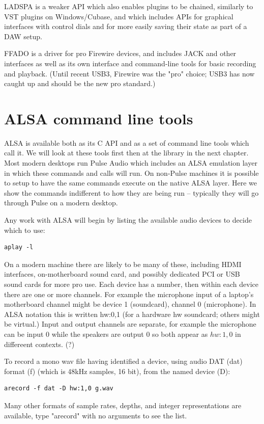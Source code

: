 \documentclass[oneside,english]{scrbook}
\begin{document}
LADSPA is a weaker API which also enables plugins to be chained, similarly to VST plugins on Windows/Cubase, and which includes APIs for graphical interfaces with control dials and for more easily saving their state as part of a DAW setup.

FFADO is a driver for pro Firewire devices, and includes JACK and other interfaces as well as its own interface and command-line tools for basic recording and playback.  (Until recent USB3, Firewire was the "pro" choice; USB3 has now caught up and should be the new pro standard.)

\chapter{ALSA command line tools}

ALSA is available both as its C API and as a set of command line tools which call it.  We will look at these tools first then at the library in the next chapter.   Most modern desktops run Pulse Audio which includes an ALSA emulation layer in which these commands and calls will run. On non-Pulse machines it is possible to setup to have the same commands execute on the native ALSA layer.  Here we show the commands indifferent to how they are being run -- typically they will go through Pulse on a modern desktop.

Any work with ALSA will begin by listing the available audio devices to decide which to use:
\begin{lstlisting}
aplay -l
\end{lstlisting}

On a modern machine there are likely to be many of these, including HDMI interfaces, on-motherboard sound card, and possibly dedicated PCI or USB sound cards for more pro use.   Each device has a number, then within each device there are one or more channels.   For example the microphone input of a laptop's motherboard channel might be device 1 (soundcard), channel 0 (microphone).  In ALSA notation this is written hw:0,1 (for a hardware hw soundcard; others might be virtual.)  Input and output channels are separate, for example the microphone can be input 0 while the speakers are output 0 so both appear as $hw:1,0$ in differeent contexts. (?)

To record a mono wav file having identified a device, using audio DAT (dat) format (f) (which is 48kHz samples, 16 bit), from the named device (D):
\begin{lstlisting}
arecord -f dat -D hw:1,0 g.wav          
\end{lstlisting}
Many other formats of sample rates, depths, and integer representations are available, type "arecord" with no arguments to see the list.
\end{document}
